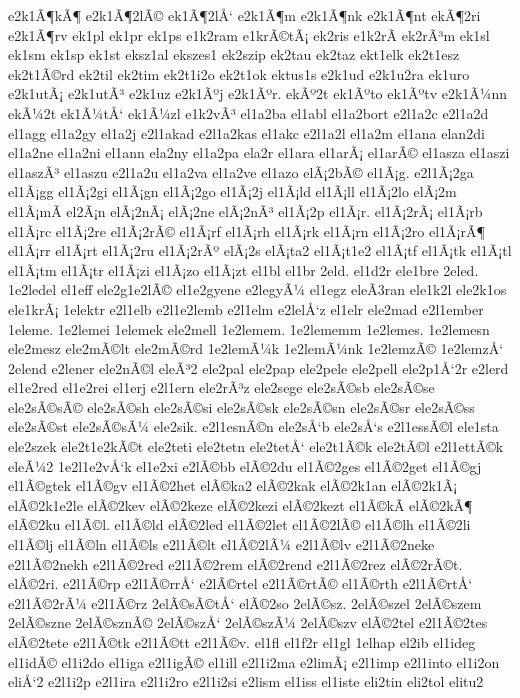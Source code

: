 {e2k1Ã¶kÃ¶
e2k1Ã¶2lÃ©
ek1Ã¶2lÅ‘
e2k1Ã¶m
e2k1Ã¶nk
e2k1Ã¶nt
ekÃ¶2ri
e2k1Ã¶rv
ek1pl
ek1pr
ek1ps
e1k2ram
e1krÃ©tÃ¡
ek2ris
e1k2rÃ­
ek2rÃ³m
ek1sl
ek1sm
ek1sp
ek1st
eksz1al
ekszes1
ek2szip
ek2tau
ek2taz
ekt1elk
ek2t1esz
ek2t1Ã©rd
ek2til
ek2tim
ek2t1i2o
ek2t1ok
ektus1s
e2k1ud
e2k1u2ra
ek1uro
e2k1utÃ¡
e2k1utÃ³
e2k1uz
e2k1Ãºj
e2k1Ãºr.
ekÃº2t
ek1Ãºto
ek1Ãºtv
e2k1Ã¼nn
ekÃ¼2t
ek1Ã¼tÅ‘
ek1Ã¼zl
e1k2vÃ³
el1a2ba
el1abl
el1a2bort
e2l1a2c
e2l1a2d
el1agg
el1a2gy
el1a2j
e2l1akad
e2l1a2kas
el1akc
e2l1a2l
el1a2m
el1ana
elan2di
el1a2ne
el1a2ni
el1ann
ela2ny
el1a2pa
ela2r
el1ara
el1arÃ¡
el1arÃ©
el1asza
el1aszi
el1aszÃ³
el1aszu
e2l1a2u
el1a2va
el1a2ve
el1azo
elÃ¡2bÃ©
el1Ã¡g.
e2l1Ã¡2ga
el1Ã¡gg
el1Ã¡2gi
el1Ã¡gn
el1Ã¡2go
el1Ã¡2j
el1Ã¡ld
el1Ã¡ll
el1Ã¡2lo
elÃ¡2m
el1Ã¡mÃ­
el2Ã¡n
elÃ¡2nÃ¡
elÃ¡2ne
elÃ¡2nÃ³
el1Ã¡2p
el1Ã¡r.
el1Ã¡2rÃ¡
el1Ã¡rb
el1Ã¡rc
el1Ã¡2re
el1Ã¡2rÃ©
el1Ã¡rf
el1Ã¡rh
el1Ã¡rk
el1Ã¡rn
el1Ã¡2ro
el1Ã¡rÃ¶
el1Ã¡rr
el1Ã¡rt
el1Ã¡2ru
el1Ã¡2rÃº
elÃ¡2s
elÃ¡ta2
el1Ã¡t1e2
el1Ã¡tf
el1Ã¡tk
el1Ã¡tl
el1Ã¡tm
el1Ã¡tr
el1Ã¡zi
el1Ã¡zo
el1Ã¡zt
el1bl
el1br
2eld.
el1d2r
ele1bre
2eled.
1e2ledel
el1eff
ele2g1e2lÃ©
el1e2gyene
e2legyÃ¼
el1egz
eleÃ­3ran
ele1k2l
ele2k1os
ele1krÃ¡
1elektr
e2l1elb
e2l1e2lemb
e2l1elm
e2lelÅ‘z
el1elr
ele2mad
e2l1ember
1eleme.
1e2lemei
1elemek
ele2mell
1e2lemem.
1e2lememm
1e2lemes.
1e2lemesn
ele2mesz
ele2mÃ©lt
ele2mÃ©rd
1e2lemÃ¼k
1e2lemÃ¼nk
1e2lemzÃ©
1e2lemzÅ‘
2elend
e2lener
ele2nÃ©l
eleÃ³2
ele2pal
ele2pap
ele2pele
ele2pell
ele2p1Å‘2r
e2lerd
el1e2red
el1e2rei
el1erj
e2l1ern
ele2rÃ³z
ele2sege
ele2sÃ©sb
ele2sÃ©se
ele2sÃ©sÃ©
ele2sÃ©sh
ele2sÃ©si
ele2sÃ©sk
ele2sÃ©sn
ele2sÃ©sr
ele2sÃ©ss
ele2sÃ©st
ele2sÃ©sÃ¼
ele2sik.
e2l1esnÃ©n
ele2sÅ‘b
ele2sÅ‘s
e2l1essÃ©l
ele1sta
ele2szek
ele2t1e2kÃ©t
ele2teti
ele2tetn
ele2tetÅ‘
ele2t1Ã©k
ele2tÃ©l
e2l1ettÃ©k
eleÃ¼2
1e2l1e2vÅ‘k
el1e2xi
e2lÃ©bb
elÃ©2du
el1Ã©2ges
el1Ã©2get
el1Ã©gj
el1Ã©gtek
el1Ã©gv
el1Ã©2het
elÃ©ka2
elÃ©2kak
elÃ©2k1an
elÃ©2k1Ã¡
elÃ©2k1e2le
elÃ©2kev
elÃ©2keze
elÃ©2kezi
elÃ©2kezt
el1Ã©kÃ­
elÃ©2kÃ¶
elÃ©2ku
el1Ã©l.
el1Ã©ld
elÃ©2led
el1Ã©2let
el1Ã©2lÃ©
el1Ã©lh
el1Ã©2li
el1Ã©lj
el1Ã©ln
el1Ã©ls
e2l1Ã©lt
el1Ã©2lÃ¼
e2l1Ã©lv
e2l1Ã©2neke
e2l1Ã©2nekh
e2l1Ã©2red
e2l1Ã©2rem
elÃ©2rend
e2l1Ã©2rez
elÃ©2rÃ©t.
elÃ©2ri.
e2l1Ã©rp
e2l1Ã©rrÅ‘
e2lÃ©rtel
e2l1Ã©rtÃ©
el1Ã©rth
e2l1Ã©rtÅ‘
e2l1Ã©2rÃ¼
e2l1Ã©rz
2elÃ©sÃ©tÅ‘
elÃ©2so
2elÃ©sz.
2elÃ©szel
2elÃ©szem
2elÃ©szne
2elÃ©sznÃ©
2elÃ©szÅ‘
2elÃ©szÃ¼
2elÃ©szv
elÃ©2tel
e2l1Ã©2tes
elÃ©2tete
e2l1Ã©tk
e2l1Ã©tt
e2l1Ã©v.
el1fl
el1f2r
el1gl
1elhap
el2ib
el1ideg
el1idÃ©
el1i2do
el1iga
e2l1igÃ©
el1ill
e2l1i2ma
e2limÃ¡
e2l1imp
e2l1into
el1i2on
eliÅ‘2
e2l1i2p
e2l1ira
e2l1i2ro
e2l1i2si
e2lism
el1iss
el1iste
eli2tin
eli2tol
elitu2
}
